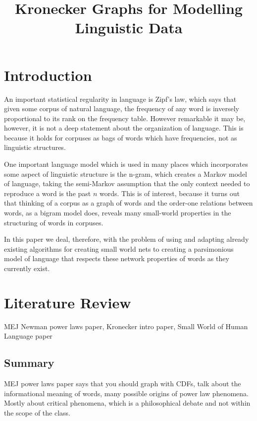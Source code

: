 \documentclass[12pt]{article}
\begin{document}
\title{Kronecker Graphs for Modelling Linguistic Data}

\section{Introduction}

An important statistical regularity in language is Zipf's law, which says that given some corpus of natural language, the frequency of any word is inversely proportional to its rank on the frequency table. However remarkable it may be, however, it is not a deep statement about the organization of language. This is because it holds for corpuses as bags of words which have frequencies, not as linguistic structures. %

One important language model which is used in many places which incorporates some aspect of linguistic structure is the n-gram, which creates a Markov model of language, taking the semi-Markov assumption that the only context needed to reproduce a word is the past $n$ words. This is of interest, because it turns out that thinking of a corpus as a graph of words and the order-one relations between words, as a bigram model does, reveals many small-world properties in the structuring of words in corpuses. %

In this paper we deal, therefore, with the problem of using and adapting already existing algorithms for creating small world nets to creating a parsimonious model of language that respects these network properties of words as they currently exist.


\section{Literature Review}

MEJ Newman power laws paper, Kronecker intro paper, Small World of Human Language paper

\subsection{Summary}
MEJ power laws paper says that you should graph with CDFs, talk about the informational meaning of words, many possible origins of power law phenomena. Mostly about critical phenomena, which is a philosophical debate and not within the scope of the class.
\end{document}
